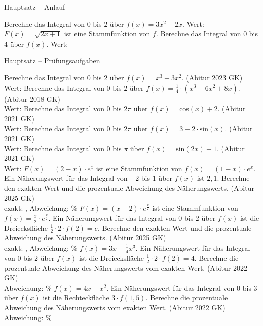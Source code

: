 \begin{aufgabe}{Hauptsatz – Anlauf}
\begin{teile}
\teil Berechne das Integral von $0$ bis $2$ über $f(x) = 3x^2 - 2x$. Wert: \leerfeld
\teil $F(x) = \sqrt{2x + 1}$ ist eine Stammfunktion von $f$. Berechne das Integral von $0$ bis $4$ über $f(x)$. Wert: \leerfeld
\end{teile}
\end{aufgabe}

\begin{aufgabe}{Hauptsatz – Prüfungsaufgaben}
\begin{teile}
\teil Berechne das Integral von $0$ bis $2$ über $f(x) = x^3 - 3x^2$. \hfill (Abitur 2023 GK) \\ Wert: \leerfeld
\teil Berechne das Integral von $0$ bis $2$ über $f(x) = \frac{1}{4} \cdot (x^3 - 6x^2 + 8x)$. \hfill (Abitur 2018 GK) \\ Wert: \leerfeld
\teil Berechne das Integral von $0$ bis $2\pi$ über $f(x) = \mathrm{cos}(x) + 2$. \hfill (Abitur 2021 GK) \\ Wert: \leerfeld
\teil Berechne das Integral von $0$ bis $2\pi$ über $f(x) = 3 - 2 \cdot \mathrm{sin}(x)$. \hfill (Abitur 2021 GK) \\ Wert: \leerfeld
\teil Berechne das Integral von $0$ bis $\pi$ über $f(x) = \mathrm{sin}(2x) + 1$. \hfill (Abitur 2021 GK) \\ Wert: \leerfeld
\teil $F(x) = (2 - x) \cdot e^{x}$ ist eine Stammfunktion von $f(x) = (1 - x) \cdot e^{x}$. Ein Näherungswert für das Integral von $-2$ bis $1$ über $f(x)$ ist $2{,}1$. Berechne den exakten Wert und die prozentuale Abweichung des Näherungswerts. \hfill (Abitur 2025 GK) \\ exakt: \leerfeld , Abweichung: \leerfeld \%
\teil $F(x) = (x - 2) \cdot e^{\frac{x}{2}}$ ist eine Stammfunktion von $f(x) = \frac{x}{2} \cdot e^{\frac{x}{2}}$. Ein Näherungswert für das Integral von $0$ bis $2$ über $f(x)$ ist die Dreiecksfläche $\frac{1}{2} \cdot 2 \cdot f(2) = e$. Berechne den exakten Wert und die prozentuale Abweichung des Näherungswerts. \hfill (Abitur 2025 GK) \\ exakt: \leerfeld , Abweichung: \leerfeld \%
\teil $f(x) = 3x - \frac{1}{4}x^3$. Ein Näherungswert für das Integral von $0$ bis $2$ über $f(x)$ ist die Dreiecksfläche $\frac{1}{2} \cdot 2 \cdot f(2) = 4$. Berechne die prozentuale Abweichung des Näherungswerts vom exakten Wert. \hfill (Abitur 2022 GK) \\ Abweichung: \leerfeld \%
\teil $f(x) = 4x - x^2$. Ein Näherungswert für das Integral von $0$ bis $3$ über $f(x)$ ist die Rechteckfläche $3 \cdot f(1{,}5)$. Berechne die prozentuale Abweichung des Näherungswerts vom exakten Wert. \hfill (Abitur 2022 GK) \\ Abweichung: \leerfeld \%
\end{teile}
\end{aufgabe}

